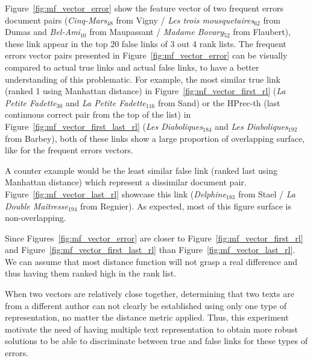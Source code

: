 Figure~\ref{fig:mf_vector_error} show the feature vector of two frequent errors document pairs (\textit{Cinq-Mars}$_{48}$ from Vigny / \textit{Les trois mousquetaires}$_{62}$ from Dumas and \textit{Bel-Ami}$_{10}$ from Maupassant / \textit{Madame Bovary}$_{52}$ from Flaubert), these link appear in the top 20 false links of 3 out 4 rank lists.
The frequent errors vector pairs presented in Figure~\ref{fig:mf_vector_error} can be visually compared to actual true links and actual false links, to have a better understanding of this problematic.
For example, the most similar true link (ranked 1 using Manhattan distance) in Figure~\ref{fig:mf_vector_first_rl} (\textit{La Petite Fadette}$_{30}$ and \textit{La Petite Fadette}$_{116}$ from Sand) or the HPrec-th (last continuous correct pair from the top of the list) in Figure~\ref{fig:mf_vector_first_last_rl} (\textit{Les Diaboliques}$_{184}$ and \textit{Les Diaboliques}$_{192}$ from Barbey), both of these links show a large proportion of overlapping surface, like for the frequent errors vectors.

A counter example would be the least similar false link (ranked last using Manhattan distance) which represent a dissimilar document pair.
Figure~\ref{fig:mf_vector_last_rl} showcase this link (\textit{Delphine}$_{183}$ from Stael / \textit{La Double Maîtresse}$_{194}$ from Regnier).
As expected, most of this figure surface is non-overlapping.

Since Figures~\ref{fig:mf_vector_error} are closer to Figure~\ref{fig:mf_vector_first_rl} and Figure~\ref{fig:mf_vector_first_last_rl} than Figure~\ref{fig:mf_vector_last_rl}.
We can assume that most distance function will not grasp a real difference and thus having them ranked high in the rank list.

When two vectors are relatively close together, determining that two texts are from a different author can not clearly be established using only one type of representation, no matter the distance metric applied.
Thus, this experiment motivate the need of having multiple text representation to obtain more robust solutions to be able to discriminate between true and false links for these types of errors.

